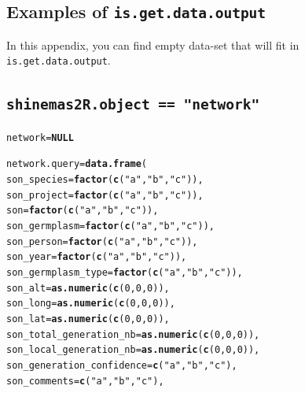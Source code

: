 \documentclass{article}\usepackage[]{graphicx}\usepackage[]{color}
\makeatletter
\newcommand{\hlnum}[1]{\textcolor[rgb]{0.686,0.059,0.569}{#1}}%
\newcommand{\hlstr}[1]{\textcolor[rgb]{0.192,0.494,0.8}{#1}}%
\newcommand{\hlstd}[1]{\textcolor[rgb]{0.345,0.345,0.345}{#1}}%
\newcommand{\hlkwa}[1]{\textcolor[rgb]{0.161,0.373,0.58}{\textbf{#1}}}%
\newcommand{\hlkwb}[1]{\textcolor[rgb]{0.69,0.353,0.396}{#1}}%
\newcommand{\hlkwc}[1]{\textcolor[rgb]{0.333,0.667,0.333}{#1}}%
\newcommand{\hlkwd}[1]{\textcolor[rgb]{0.737,0.353,0.396}{\textbf{#1}}}%
\newenvironment{kframe}{%
 \def\at@end@of@kframe{}%
 \ifinner\ifhmode%
  \def\at@end@of@kframe{\end{minipage}}%
  \begin{minipage}{\columnwidth}%
 \fi\fi%
 \def\FrameCommand##1{\hskip\@totalleftmargin \hskip-\fboxsep
 \colorbox{shadecolor}{##1}\hskip-\fboxsep
     \hskip-\linewidth \hskip-\@totalleftmargin \hskip\columnwidth}%
 \MakeFramed {\advance\hsize-\width
   \@totalleftmargin\z@ \linewidth\hsize
   \@setminipage}}%
 {\par\unskip\endMakeFramed%
 \at@end@of@kframe}
\newenvironment{knitrout}{}{} %
\makeatother
\begin{document}
\begin{appendices}
\section{Examples of \texttt{is.get.data.output}}
\label{examples_is_get_data_output}

In this appendix, you can find empty data-set that will fit in \texttt{is.get.data.output}.

\subsection{\texttt{shinemas2R.object == "network"}}
\begin{knitrout}
\color{fgcolor}\begin{kframe}
\begin{alltt}
\hlstd{network} \hlkwb{=} \hlkwa{NULL}

\hlstd{network.query} \hlkwb{=} \hlkwd{data.frame}\hlstd{(}
        \hlkwc{son_species} \hlstd{=} \hlkwd{factor}\hlstd{(}\hlkwd{c}\hlstd{(}\hlstr{"a"}\hlstd{,} \hlstr{"b"}\hlstd{,} \hlstr{"c"}\hlstd{)),}
        \hlkwc{son_project} \hlstd{=} \hlkwd{factor}\hlstd{(}\hlkwd{c}\hlstd{(}\hlstr{"a"}\hlstd{,} \hlstr{"b"}\hlstd{,} \hlstr{"c"}\hlstd{)),}
        \hlkwc{son} \hlstd{=} \hlkwd{factor}\hlstd{(}\hlkwd{c}\hlstd{(}\hlstr{"a"}\hlstd{,} \hlstr{"b"}\hlstd{,} \hlstr{"c"}\hlstd{)),}
        \hlkwc{son_germplasm} \hlstd{=} \hlkwd{factor}\hlstd{(}\hlkwd{c}\hlstd{(}\hlstr{"a"}\hlstd{,} \hlstr{"b"}\hlstd{,} \hlstr{"c"}\hlstd{)),}
        \hlkwc{son_person} \hlstd{=} \hlkwd{factor}\hlstd{(}\hlkwd{c}\hlstd{(}\hlstr{"a"}\hlstd{,} \hlstr{"b"}\hlstd{,} \hlstr{"c"}\hlstd{)),}
        \hlkwc{son_year} \hlstd{=} \hlkwd{factor}\hlstd{(}\hlkwd{c}\hlstd{(}\hlstr{"a"}\hlstd{,} \hlstr{"b"}\hlstd{,} \hlstr{"c"}\hlstd{)),}
        \hlkwc{son_germplasm_type} \hlstd{=} \hlkwd{factor}\hlstd{(}\hlkwd{c}\hlstd{(}\hlstr{"a"}\hlstd{,} \hlstr{"b"}\hlstd{,} \hlstr{"c"}\hlstd{)),}
        \hlkwc{son_alt} \hlstd{=} \hlkwd{as.numeric}\hlstd{(}\hlkwd{c}\hlstd{(}\hlnum{0}\hlstd{,} \hlnum{0}\hlstd{,} \hlnum{0}\hlstd{)),}
        \hlkwc{son_long} \hlstd{=} \hlkwd{as.numeric}\hlstd{(}\hlkwd{c}\hlstd{(}\hlnum{0}\hlstd{,} \hlnum{0}\hlstd{,} \hlnum{0}\hlstd{)),}
        \hlkwc{son_lat} \hlstd{=} \hlkwd{as.numeric}\hlstd{(}\hlkwd{c}\hlstd{(}\hlnum{0}\hlstd{,} \hlnum{0}\hlstd{,} \hlnum{0}\hlstd{)),}
        \hlkwc{son_total_generation_nb} \hlstd{=} \hlkwd{as.numeric}\hlstd{(}\hlkwd{c}\hlstd{(}\hlnum{0}\hlstd{,} \hlnum{0}\hlstd{,} \hlnum{0}\hlstd{)),}
        \hlkwc{son_local_generation_nb} \hlstd{=} \hlkwd{as.numeric}\hlstd{(}\hlkwd{c}\hlstd{(}\hlnum{0}\hlstd{,} \hlnum{0}\hlstd{,} \hlnum{0}\hlstd{)),}
        \hlkwc{son_generation_confidence} \hlstd{=} \hlkwd{c}\hlstd{(}\hlstr{"a"}\hlstd{,} \hlstr{"b"}\hlstd{,} \hlstr{"c"}\hlstd{),}
        \hlkwc{son_comments} \hlstd{=} \hlkwd{c}\hlstd{(}\hlstr{"a"}\hlstd{,} \hlstr{"b"}\hlstd{,} \hlstr{"c"}\hlstd{),}


\end{alltt}
\end{kframe}
\end{knitrout}
\end{appendices}
\end{document}
